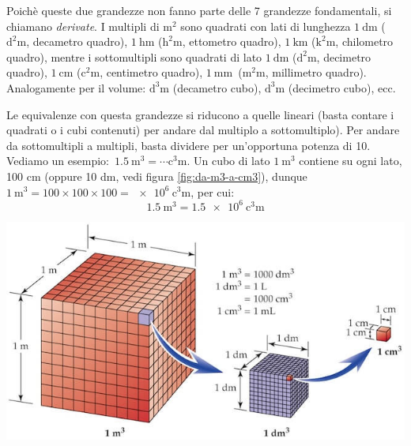 Poichè queste due grandezze non fanno parte delle 7 grandezze fondamentali, si chiamano \textit{derivate}. I multipli di \(\si{\square\meter}\) sono quadrati con lati di lunghezza \(\SI{1}{\deca\meter}\) (\(\si{\square\deca\meter}\), decametro quadro), \(\SI{1}{\hecto\meter}\) (\(\si{\square\hecto\meter}\), ettometro quadro), \(\SI{1}{\kilo\meter}\) (\(\si{\square\kilo\meter}\), chilometro quadro), mentre i sottomultipli sono quadrati di lato \(\SI{1}{\deci\meter}\) (\(\si{\square\deci\meter}\), decimetro quadro), \(\SI{1}{\centi\meter}\) (\(\si{\square\centi\meter}\), centimetro quadro), \(\SI{1}{\milli\meter}\)\ (\(\si{\square\milli\meter}\), millimetro quadro). Analogamente per il volume: \(\si{\cubic\deca\meter}\) (decametro cubo), \(\si{\cubic\deci\meter}\) (decimetro cubo), ecc.


Le  equivalenze con questa grandezze si riducono a quelle lineari (basta contare i quadrati o i cubi contenuti) per andare dal multiplo a sottomultiplo). Per andare da sottomultipli a  multipli, basta dividere per un'opportuna potenza di 10. Vediamo un esempio: \,$\SI{1,5}{\cubic\meter} = \cdots \si{\cubic\centi\meter}$. Un cubo di lato $\SI{1}{\cubic\meter}$ contiene su ogni lato, 100 cm (oppure 10 dm, vedi  figura \ref{fig:da-m3-a-cm3}), dunque $\SI{1}{\cubic\meter} = 100\times100\times100 = \SI{e+6}{\cubic\centi\meter}$, per cui:
\[
\SI{1,5}{\cubic\meter} = \SI{1,5e+6}{\cubic\centi\meter}
\]

\begin{minipage}{\linewidth}
	\centering
	\includegraphics[scale=0.5]{da-m3-a-cm3}
	\label{fig:da-m3-a-cm3}
\end{minipage}






